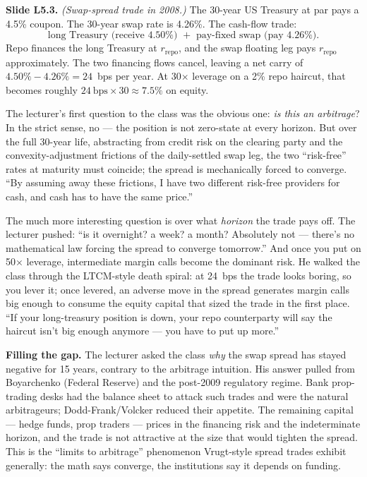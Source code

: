 \begin{keyblock}
\textbf{Slide L5.3.} \emph{(Swap-spread trade in 2008.)} The
30-year US Treasury at par pays a 4.5\% coupon. The 30-year swap rate
is 4.26\%. The cash-flow trade:
\[
  \text{long Treasury (receive 4.50\%) } + \text{ pay-fixed swap (pay 4.26\%)}.
\]
Repo finances the long Treasury at $r_{\text{repo}}$, and the swap
floating leg pays $r_{\text{repo}}$ approximately. The two financing
flows cancel, leaving a net carry of $4.50\% - 4.26\% = 24$~bps per year.
At 30$\times$ leverage on a 2\% repo haircut, that becomes roughly
$24~\text{bps} \times 30 \approx 7.5\%$ on equity.
\end{keyblock}

The lecturer's first question to the class was the obvious one:
\emph{is this an arbitrage}? In the strict sense, no --- the position
is not zero-state at every horizon. But over the full 30-year life,
abstracting from credit risk on the clearing party and the
convexity-adjustment frictions of the daily-settled swap leg, the two
``risk-free'' rates at maturity must coincide; the spread is
mechanically forced to converge. ``By assuming away these frictions, I
have two different risk-free providers for cash, and cash has to have
the same price.''

The much more interesting question is over what \emph{horizon} the
trade pays off. The lecturer pushed: ``is it overnight? a week? a
month? Absolutely not --- there's no mathematical law forcing the
spread to converge tomorrow.'' And once you put on 50$\times$ leverage,
intermediate margin calls become the dominant risk. He walked the
class through the LTCM-style death spiral: at 24~bps the trade looks
boring, so you lever it; once levered, an adverse move in the spread
generates margin calls big enough to consume the equity capital that
sized the trade in the first place. ``If your long-treasury position
is down, your repo counterparty will say the haircut isn't big enough
anymore --- you have to put up more.''

\begin{tipblock}
\textbf{Filling the gap.} The lecturer asked the class \emph{why} the
swap spread has stayed negative for 15 years, contrary to the
arbitrage intuition. His answer pulled from Boyarchenko (Federal
Reserve) and the post-2009 regulatory regime. Bank prop-trading desks
had the balance sheet to attack such trades and were the natural
arbitrageurs; Dodd-Frank/Volcker reduced their appetite. The
remaining capital --- hedge funds, prop traders --- prices in the
financing risk and the indeterminate horizon, and the trade is not
attractive at the size that would tighten the spread. This is the
``limits to arbitrage'' phenomenon Vrugt-style spread trades exhibit
generally: the math says converge, the institutions say it depends on
funding.
\end{tipblock}

